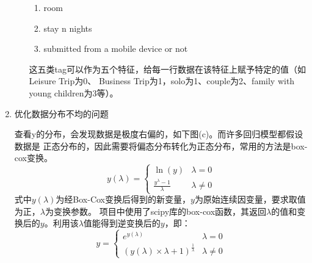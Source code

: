 \documentclass[UTF8,a4paper,12pt]{article}
\begin{document}
\begin{enumerate}[itemindent=0.5em,label=\arabic*、]
\begin{enumerate}[itemindent=0.5em,label=(\arabic*)]
\begin{enumerate}
      \item room
      \item stay n nights
      \item submitted from a mobile device or not
    \end{enumerate}
    这五类tag可以作为五个特征，给每一行数据在该特征上赋予特定的值（如Leisure Trip为0、
    Business Trip为1，solo为1、couple为2、family with young children为3等）。
  \end{enumerate}
  \item 优化数据分布不均的问题
  \par \qquad 查看y的分布，会发现数据是极度右偏的，如下图(c)。而许多回归模型都假设数据是
  正态分布的，因此需要将偏态分布转化为正态分布，常用的方法是box-cox变换。
    \begin{equation}
      y(\lambda)=
      \begin{cases}
       \ln(y)& \lambda =0\\
       \frac{y^{\lambda} - 1}{\lambda}& \lambda \neq 0
      \end{cases}
    \end{equation}
    式中$y(\lambda)$为经Box-Cox变换后得到的新变量，$y$为原始连续因变量，要求取值为正，$\lambda$为变换参数。
    项目中使用了scipy库的box-cox函数，其返回$\lambda$的值和变换后的$y$。利用该$\lambda$值能得到逆变换后的$y$，即：
    \begin{equation}
      y=
      \begin{cases}
       e^{y(\lambda)}& \lambda =0\\
       (y(\lambda) \times \lambda + 1)^{\frac{1}{\lambda}}& \lambda \neq 0
      \end{cases}
    \end{equation}

  \begin{figure}[H]
  \centering
  \end{figure}


\end{enumerate}
\end{document}

